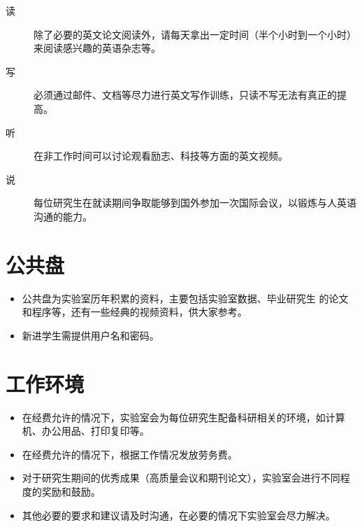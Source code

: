 \documentclass[a4paper，12pt]{article}
\begin{document}
\begin{description}

\item[读] 除了必要的英文论文阅读外，请每天拿出一定时间（半个小时到一个小时）来阅读感兴趣的英语杂志等。

\item[写] 必须通过邮件、文档等尽力进行英文写作训练，只读不写无法有真正的提高。

\item[听] 在非工作时间可以讨论观看励志、科技等方面的英文视频。

\item[说] 每位研究生在就读期间争取能够到国外参加一次国际会议，以锻炼与人英语沟通的能力。

\end{description}

\section{公共盘}

\begin{itemize}

\item 公共盘为实验室历年积累的资料，主要包括实验室数据、毕业研究生
的论文和程序等，还有一些经典的视频资料，供大家参考。

\item 新进学生需提供用户名和密码。

\end{itemize}

\section{工作环境}

\begin{itemize}

\item 在经费允许的情况下，实验室会为每位研究生配备科研相关的环境，如计算机、办公用品、打印复印等。

\item  在经费允许的情况下，根据工作情况发放劳务费。

\item 对于研究生期间的优秀成果（高质量会议和期刊论文），实验室会进行不同程度的奖励和鼓励。

\item 其他必要的要求和建议请及时沟通，在必要的情况下实验室会尽力解决。

\end{itemize}
\end{document}

